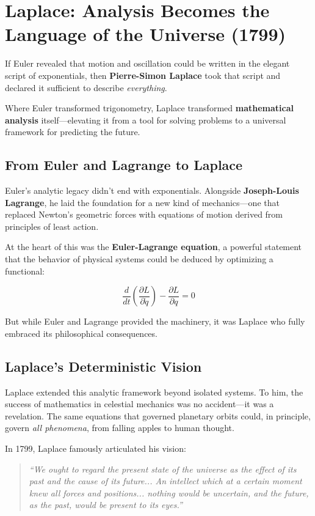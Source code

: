 \section{Laplace: Analysis Becomes the Language of the Universe (1799)}

If Euler revealed that motion and oscillation could be written in the elegant script of exponentials, then \textbf{Pierre-Simon Laplace} took that script and declared it sufficient to describe \textit{everything}.

Where Euler transformed trigonometry, Laplace transformed \textbf{mathematical analysis} itself—elevating it from a tool for solving problems to a universal framework for predicting the future.

\subsection{From Euler and Lagrange to Laplace}

Euler’s analytic legacy didn’t end with exponentials. Alongside \textbf{Joseph-Louis Lagrange}, he laid the foundation for a new kind of mechanics—one that replaced Newton’s geometric forces with equations of motion derived from principles of least action.

At the heart of this was the \textbf{Euler-Lagrange equation}, a powerful statement that the behavior of physical systems could be deduced by optimizing a functional:

\[
\frac{d}{dt} \left( \frac{\partial L}{\partial \dot{q}} \right) - \frac{\partial L}{\partial q} = 0
\]

But while Euler and Lagrange provided the machinery, it was Laplace who fully embraced its philosophical consequences.

\subsection{Laplace’s Deterministic Vision}

Laplace extended this analytic framework beyond isolated systems. To him, the success of mathematics in celestial mechanics was no accident—it was a revelation. The same equations that governed planetary orbits could, in principle, govern \textit{all phenomena}, from falling apples to human thought.

In 1799, Laplace famously articulated his vision:

\begin{quote}
\textit{“We ought to regard the present state of the universe as the effect of its past and the cause of its future...  
An intellect which at a certain moment knew all forces and positions...  
nothing would be uncertain, and the future, as the past, would be present to its eyes.”}
\end{quote}

